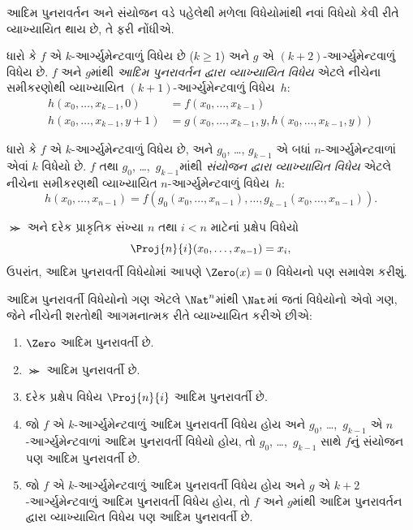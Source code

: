 \begingroup
\makeatletter{}\makeatother

\label{guunit:OLP-0213}


આદિમ પુનરાવર્તન અને સંયોજન વડે પહેલેથી મળેલા વિધેયોમાંથી નવાં વિધેયો
કેવી રીતે વ્યાખ્યાયિત થાય છે, તે ફરી નોંધીએ.

\begin{defn}
   ધારો કે $f$ એ $k$-આર્ગ્યુમેન્ટવાળું
  વિધેય છે ($k\ge 1$) અને $g$ એ $(k+2)$-આર્ગ્યુમેન્ટવાળું વિધેય છે.
  $f$ અને $g$માંથી \emph{આદિમ પુનરાવર્તન દ્વારા વ્યાખ્યાયિત વિધેય}
  એટલે નીચેના સમીકરણોથી વ્યાખ્યાયિત $(k+1)$-આર્ગ્યુમેન્ટવાળું
  વિધેય~$h$:
  \begin{align*}
    h(x_0,\dots,x_{k-1},0) & =  f(x_0,\dots,x_{k-1}) \\
    h(x_0,\dots,x_{k-1},y+1) & = g(x_0,\dots,x_{k-1}, y, h(x_0,\dots,x_{k-1}, y))
  \end{align*}
\end{defn}

\begin{defn}
   ધારો કે $f$ એ $k$-આર્ગ્યુમેન્ટવાળું
  વિધેય છે, અને $g_0$, \dots, $g_{k-1}$ એ બધાં
  $n$-આર્ગ્યુમેન્ટવાળાં એવાં $k$ વિધેયો છે. $f$ તથા
  $g_0$, \dots,~$g_{k-1}$માંથી \emph{સંયોજન દ્વારા વ્યાખ્યાયિત વિધેય}
  એટલે નીચેના સમીકરણથી વ્યાખ્યાયિત $n$-આર્ગ્યુમેન્ટવાળું વિધેય~$h$:
  \[
  h(x_0, \dots, x_{n-1}) =
  f(g_0(x_0, \dots, x_{n-1}), \dots, g_{k-1}(x_0, \dots, x_{n-1})).
  \]
\end{defn}

$\Succ$ અને દરેક પ્રાકૃતિક સંખ્યા $n$ તથા $i < n$ માટેનાં પ્રક્ષેપ
વિધેયો
\[
\Proj{n}{i}(x_0,\dots,x_{n-1}) = x_i,
\]
ઉપરાંત, આદિમ પુનરાવર્તી વિધેયોમાં આપણે $\Zero(x) = 0$ વિધેયનો પણ
સમાવેશ કરીશું.

\begin{defn}
  આદિમ પુનરાવર્તી વિધેયોનો ગણ એટલે $\Nat^n$માંથી $\Nat$માં જતાં
  વિધેયોનો એવો ગણ, જેને નીચેની શરતોથી આગમનાત્મક રીતે વ્યાખ્યાયિત
  કરીએ છીએ:
  \begin{enumerate}
  \item $\Zero$ આદિમ પુનરાવર્તી છે.
  \item $\Succ$ આદિમ પુનરાવર્તી છે.
  \item દરેક પ્રક્ષેપ વિધેય $\Proj{n}{i}$ આદિમ પુનરાવર્તી છે.
  \item જો $f$ એ $k$-આર્ગ્યુમેન્ટવાળું આદિમ પુનરાવર્તી વિધેય હોય અને
    $g_0$, \dots,~$g_{k-1}$ એ $n$-આર્ગ્યુમેન્ટવાળાં આદિમ
    પુનરાવર્તી વિધેયો હોય, તો $g_0$, \dots,~$g_{k-1}$ સાથે $f$નું
    સંયોજન પણ આદિમ પુનરાવર્તી છે.
  \item જો $f$ એ $k$-આર્ગ્યુમેન્ટવાળું આદિમ પુનરાવર્તી વિધેય હોય અને
    $g$ એ $k+2$-આર્ગ્યુમેન્ટવાળું આદિમ પુનરાવર્તી વિધેય હોય, તો
    $f$ અને $g$માંથી આદિમ પુનરાવર્તન દ્વારા વ્યાખ્યાયિત વિધેય પણ
    આદિમ પુનરાવર્તી છે.
\end{enumerate}
\end{defn}

